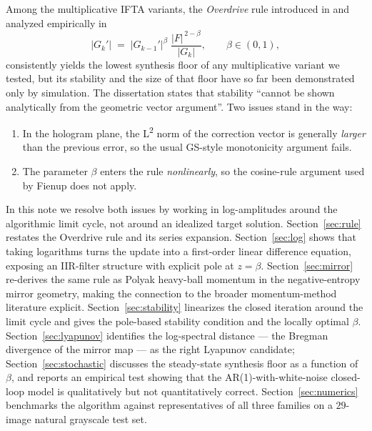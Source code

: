 \documentclass[11pt,a4paper]{article}
\newcommand{\F}{\lvert F\rvert}
\newcommand{\Gk}{\lvert G_k\rvert}
\newcommand{\Gkm}{\lvert G_{k-1}'\rvert}
\newcommand{\Gkp}{\lvert G_k'\rvert}
\begin{document}
Among the multiplicative IFTA variants, the \emph{Overdrive} rule introduced
in \cite{Bernau2007} and analyzed empirically in \cite{Bernau2012}
\begin{equation}
  \Gkp \;=\; \Gkm^{\beta}\;\frac{\F^{\,2-\beta}}{\Gk}, \qquad \beta\in(0,1),
  \label{eq:overdrive}
\end{equation}
consistently yields the lowest synthesis floor of any multiplicative
variant we tested, but its stability and the size of that floor have so far
been demonstrated only by simulation. The dissertation
\cite[Sec.~4.4]{Bernau2012} states that stability ``cannot be shown
analytically from the geometric vector argument''. Two issues stand in the
way:
\begin{enumerate}
  \item In the hologram plane, the L\textsuperscript{2} norm of the correction
        vector is generally \emph{larger} than the previous error, so the
        usual GS-style monotonicity argument fails.
  \item The parameter $\beta$ enters the rule \emph{nonlinearly}, so the
        cosine-rule argument used by Fienup \cite{Fienup1980} does not apply.
\end{enumerate}

In this note we resolve both issues by working in log-amplitudes around the
algorithmic limit cycle, not around an idealized target solution.
Section~\ref{sec:rule} restates the Overdrive rule and its series expansion.
Section~\ref{sec:log} shows that taking logarithms turns the update into a
first-order linear difference equation, exposing an IIR-filter structure with
explicit pole at $z=\beta$. Section~\ref{sec:mirror} re-derives the same rule
as Polyak heavy-ball momentum in the negative-entropy mirror geometry,
making the connection to the broader momentum-method literature explicit.
Section~\ref{sec:stability} linearizes the closed iteration around the limit
cycle and gives the pole-based stability condition and the locally optimal
$\beta$. Section~\ref{sec:lyapunov} identifies the log-spectral distance ---
the Bregman divergence of the mirror map --- as the right Lyapunov
candidate; Section~\ref{sec:stochastic} discusses the steady-state synthesis
floor as a function of $\beta$, and reports an empirical test showing that
the AR(1)-with-white-noise closed-loop model is qualitatively but not
quantitatively correct. Section~\ref{sec:numerics} benchmarks the algorithm
against representatives of all three families on a $29$-image natural
grayscale test set.
\end{document}
